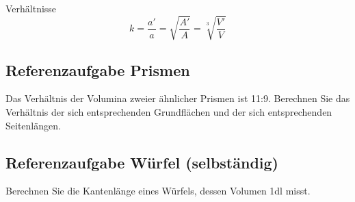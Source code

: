 \begin{bemerkung}{Verhältnisse}{}
  $$k = \frac{a'}{a} = \sqrt{\frac{A'}{A}} = \sqrt[3\,\,\,]{\frac{V'}{V}}$$
\end{bemerkung}
\newpage


\subsection{Referenzaufgabe Prismen}
Das Verhältnis der Volumina zweier ähnlicher Prismen ist
11:9. Berechnen Sie das Verhältnis der sich entsprechenden Grundflächen und
der sich entsprechenden Seitenlängen.


\subsection{Referenzaufgabe Würfel (selbständig)}

Berechnen Sie die Kantenlänge eines Würfels, dessen Volumen 1dl misst.

\newpage
